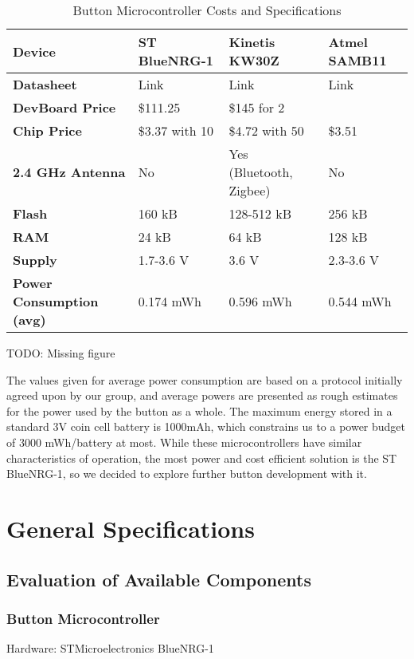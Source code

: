 \documentclass[journal]{IEEEtran}
\begin{document}
\begin{table*}[t]
  \centering
  \begin{tabular}{>{\bfseries}l|l l l}
    Device & ST BlueNRG-1 & Kinetis KW30Z & Atmel SAMB11 \\
    \hline
    Datasheet & Link & Link & Link \\
    DevBoard Price & \$111.25 & \$145 for 2 & \\
    Chip Price & \$3.37 with 10 & \$4.72 with 50 & \$3.51 \\
    2.4 GHz Antenna & No & Yes (Bluetooth, Zigbee) & No \\
    Flash & 160 kB & 128-512 kB & 256 kB \\
    RAM & 24 kB & 64 kB & 128 kB \\
    Supply & 1.7-3.6 V & 3.6 V & 2.3-3.6 V \\
    Power Consumption (avg) & 0.174 mWh & 0.596 mWh & 0.544 mWh
  \end{tabular}
  \caption{Button Microcontroller Costs and Specifications}
\end{table*}

TODO: Missing figure

The values given for average power consumption are based on a protocol initially agreed upon by our group, and average powers are presented as rough estimates for the power used by the button as a whole.  The maximum energy stored in a standard 3V coin cell battery is 1000mAh, which constrains us to a power budget of 3000 mWh/battery at most.  While these microcontrollers have similar characteristics of operation, the most power and cost efficient solution is the ST BlueNRG-1, so we decided to explore further button development with it.

\section{General Specifications}

\subsection{Evaluation of Available Components}

\subsubsection{Button Microcontroller}

Hardware: STMicroelectronics BlueNRG-1
\end{document}
